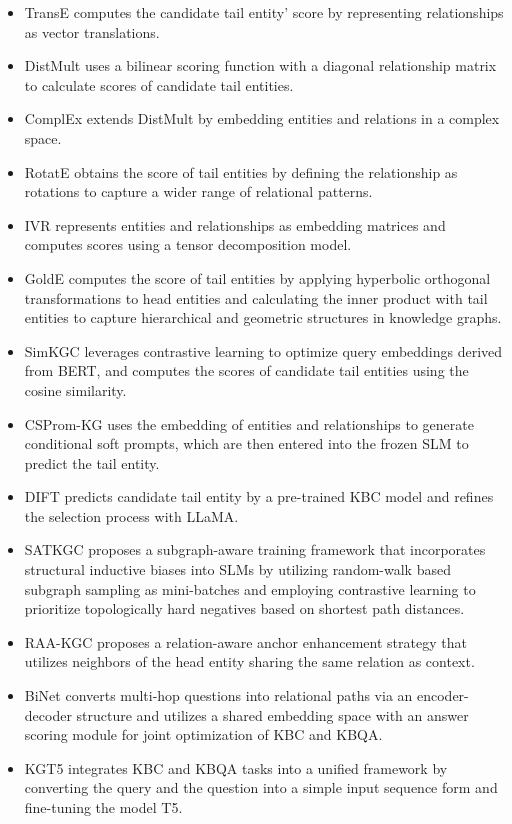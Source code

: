 \begin{itemize}[left=0pt]
\item TransE \cite{bordes2013} computes the candidate tail entity' score by representing relationships as vector translations.
\item DistMult \cite{yang2015} uses a bilinear scoring function with a diagonal relationship matrix to calculate scores of candidate tail entities.
\item ComplEx \cite{trouillon2016complex} extends DistMult by embedding entities and relations in a complex space.
\item RotatE \cite{sun2018rotate} obtains the score of tail entities by defining the relationship as rotations to capture a wider range of relational patterns.
\item IVR \cite{xiao2024knowledge} represents entities and relationships as embedding matrices and computes scores using a tensor decomposition model.
\item GoldE \cite{GoldE} computes the score of tail entities by applying hyperbolic orthogonal transformations to head entities and calculating the inner product with tail entities to capture hierarchical and geometric structures in knowledge graphs.

\item SimKGC \cite{wang-etal-2022-simkgc} leverages contrastive learning to optimize query embeddings derived from BERT, and computes the scores of candidate tail entities using the cosine similarity.
\item CSProm-KG \cite{chen-etal-2023-dipping} uses the embedding of entities and relationships to generate conditional soft prompts, which are then entered into the frozen SLM to predict the tail entity.
\item DIFT \cite{liu2024finetuninggenerativelargelanguage} predicts candidate tail entity by a pre-trained KBC model and refines the selection process with LLaMA.
\item SATKGC \cite{satkgc} proposes a subgraph-aware training framework that incorporates structural inductive biases into SLMs by utilizing random-walk based subgraph sampling as mini-batches and employing contrastive learning to prioritize topologically hard negatives based on shortest path distances.
\item RAA-KGC \cite{raa-kgc} proposes a relation-aware anchor enhancement strategy that utilizes neighbors of the head entity sharing the same relation as context.
\item BiNet \cite{lihui2022binet} converts multi-hop questions into relational paths via an encoder-decoder structure and utilizes a shared embedding space with an answer scoring module for joint optimization of KBC and KBQA.
\item KGT5 \cite{saxena2022kgt5} integrates KBC and KBQA tasks into a unified framework by converting the query and the question into a simple input sequence form and fine-tuning the model T5.
\end{itemize}

